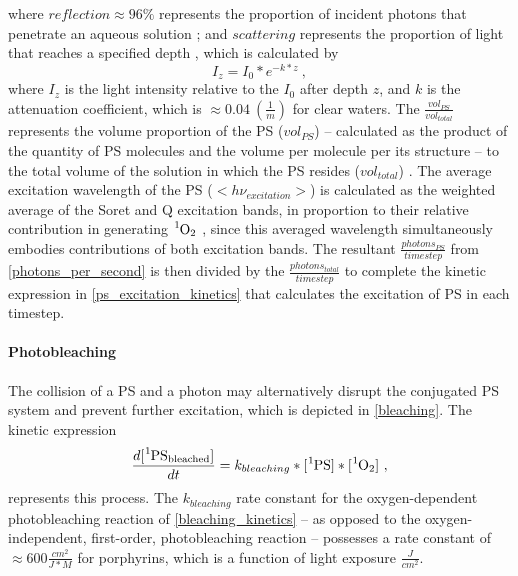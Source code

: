 where $reflection \approx 96 \%$ represents the proportion of incident photons that penetrate an aqueous solution \cite{Gross1993SingletLiposomes}; and $scattering$ represents the proportion of light that reaches a specified depth \cite{RobertW.1973TheSea}, which is calculated by 
\begin{equation}
    I_z = I_0*e^{-k*z}~,
\end{equation}
where $I_z$ is the light intensity relative to the $I_0$ after depth $z$, and $k$ is the attenuation coefficient, which is $\approx 0.04~(\frac{1}{m})$ \cite{Lorenzen1972ExtinctionPhytoplankton} for clear waters. The $\frac{vol_{PS}}{vol_{total}}$ represents the volume proportion of the PS ($vol_{PS}$) -- calculated as the product of the quantity of PS molecules and the volume per molecule per its structure -- to the total volume of the solution in which the PS resides ($vol_{total}$) \cite{Santos2020ApplicationAureus}. The average excitation wavelength of the PS ($<h\nu_{excitation}>$) is calculated as the weighted average of the Soret and Q excitation bands, in proportion to their relative contribution in generating $\ce{^1O2}$ \cite{Nitzan2001PhotoinactivationWavelengths,Hoenes2020PhotoinactivationWavelength}, since this averaged wavelength simultaneously embodies contributions of both excitation bands. The resultant $\frac{photons_{PS}}{timestep}$ from \cref{photons_per_second} is then divided by the $\frac{photons_{total}}{timestep}$ to complete the kinetic expression in \cref{ps_excitation_kinetics} that calculates the excitation of PS in each timestep. 

\paragraph{Photobleaching}
The collision of a PS and a photon may alternatively disrupt the conjugated PS system and prevent further excitation, which is depicted in \cref{bleaching}. The kinetic expression 
\begin{equation} \label{bleaching_kinetics}
    \frac{d[\ce{^1PS_{bleached}}]}{dt} = k_{bleaching}*[\ce{^1PS}]*[\ce{^1O2}]~,
\end{equation}
represents this process. The $k_{bleaching}$ rate constant for the oxygen-dependent photobleaching reaction of \cref{bleaching_kinetics} -- as opposed to the oxygen-independent, first-order, photobleaching reaction \cite{Bonnett1999PhotobleachingStudy,Mang1987PhotobleachingTherapy} -- possesses a rate constant of $\approx 600 \frac{cm^2}{J*M}$ \cite{Dysart2005CalculationCells} for porphyrins, which is a function of light exposure $\frac{J}{cm^2}$.

